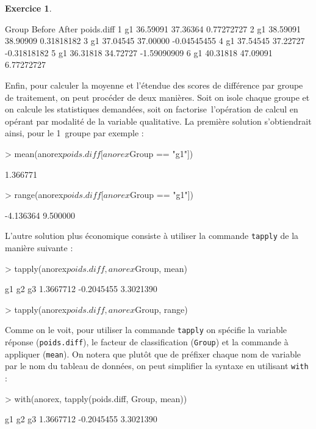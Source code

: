 \documentclass[11pt]{report}
\theoremstyle{definition}
\newtheorem{exo}{Exercice}[chapter]
\begin{document}
\begin{exo}
\begin{sol}
\begin{Schunk}
\begin{Soutput}
  Group   Before    After  poids.diff
1    g1 36.59091 37.36364  0.77272727
2    g1 38.59091 38.90909  0.31818182
3    g1 37.04545 37.00000 -0.04545455
4    g1 37.54545 37.22727 -0.31818182
5    g1 36.31818 34.72727 -1.59090909
6    g1 40.31818 47.09091  6.77272727
\end{Soutput}
\end{Schunk}
Enfin, pour calculer la moyenne et l'étendue des scores de différence par
groupe de traitement, on peut procéder de deux manières. Soit on isole
chaque groupe et on calcule les statistiques demandées, soit on \og
factorise\fg\ l'opération de calcul en opérant par modalité de la variable
qualitative. La première solution s'obtiendrait ainsi, pour le 1\ier\ groupe
par exemple :
\begin{Schunk}
\begin{Sinput}
> mean(anorex$poids.diff[anorex$Group == "g1"])
\end{Sinput}
\begin{Soutput}
[1] 1.366771
\end{Soutput}
\begin{Sinput}
> range(anorex$poids.diff[anorex$Group == "g1"])
\end{Sinput}
\begin{Soutput}
[1] -4.136364  9.500000
\end{Soutput}
\end{Schunk}
L'autre solution plus économique consiste à utiliser la commande
\texttt{tapply} de la manière suivante :
\begin{Schunk}
\begin{Sinput}
> tapply(anorex$poids.diff, anorex$Group, mean)
\end{Sinput}
\begin{Soutput}
        g1         g2         g3 
 1.3667712 -0.2045455  3.3021390 
\end{Soutput}
\begin{Sinput}
> tapply(anorex$poids.diff, anorex$Group, range)
\end{Sinput}
\end{Schunk}
Comme on le voit, pour utiliser la commande \texttt{tapply} on spécifie la
variable réponse (\texttt{poids.diff}), le facteur de classification
(\texttt{Group}) et la commande à appliquer (\texttt{mean}). On notera que
plutôt que de préfixer chaque nom de variable par le nom du tableau de
données, on peut simplifier la syntaxe en utilisant \texttt{with} :
\begin{Schunk}
\begin{Sinput}
> with(anorex, tapply(poids.diff, Group, mean))
\end{Sinput}
\begin{Soutput}
        g1         g2         g3 
 1.3667712 -0.2045455  3.3021390 
\end{Soutput}
\end{Schunk}
\end{sol}
\end{exo}
\end{document}
